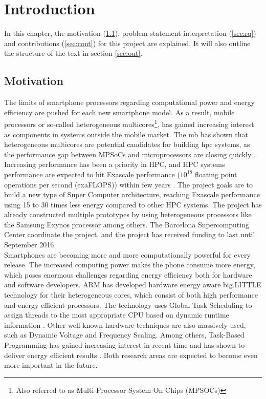 \chapter{Introduction}
In this chapter, the motivation (\ref{sec:mot}), problem statement interpretation (\ref{sec:rq}) and contributions (\ref{sec:cont}) for this project are explained. It will also outline the structure of the text in section \ref{sec:out}.

\section{Motivation}
\label{sec:mot}
The limits of smartphone processors regarding computational power and energy efficiency are pushed for each new smartphone model. As a result, mobile processors or so-called heterogeneous multicores\footnote{Also referred to as Multi-Processor System On Chips (MPSOCs)}, has gained increasing interest as components in systems outside the mobile market. The \gls{mb} \cite{m:MB} has shown that heterogeneous multicores are potential candidates for building \gls{hpc} systems, as the performance gap between MPSoCs and microprocessors are closing quickly \cite{a:MB:Raj13}. Increasing performance has been a priority in HPC, and HPC systems performance are expected to hit Exascale performance ($10^{18}$ floating point operations per second (exaFLOPS)) within few years \cite{m:Top500}. The project goals are to build a new type of Super Computer architecture, reaching Exascale performance using 15 to 30 times less energy compared to other HPC systems. The project has already constructed multiple prototypes by using heterogeneous processors like the Samsung Exynos \cite{m:Exy} processor among others. The Barcelona Supercomputing Center coordinate the project, and the project has received funding to last until September 2016. \\

Smartphones are becoming more and more computationally powerful for every release. The increased computing power makes the phone consume more energy, which poses enormous challenges regarding energy efficiency both for hardware and software developers. ARM has developed hardware energy aware big.LITTLE technology for their heterogeneous cores, which consist of both high performance and energy efficient processors. The technology uses Global Task Scheduling to assign threads to the most appropriate CPU based on dynamic runtime information \cite{a:ARM:bL}. Other well-known hardware techniques are also massively used, such as Dynamic Voltage and Frequency Scaling. Among others, Task-Based Programming has gained increasing interest in recent time and has shown to deliver energy efficient results \cite{a:Lien2012}. Both research areas are expected to become even more important in the future. \\


